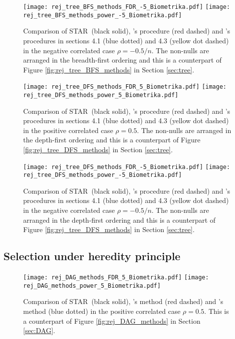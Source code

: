 \documentclass{biometrika}
\renewcommand{\star}{STAR}
\newcommand{\1}{\mathbf{1}}
\begin{document}
\begin{figure}[h]
  \centering
  \texttt{[image: rej\_tree\_BFS\_methods\_FDR\_-5\_Biometrika.pdf]}
  \texttt{[image: rej\_tree\_BFS\_methods\_power\_-5\_Biometrika.pdf]}
  \caption{Comparison of \star ~(black solid), \cite{yekutieli08}'s procedure (red dashed) and \cite{lynch16}'s procedures in  sections 4.1 (blue dotted) and 4.3 (yellow dot dashed) in the negative correlated case $\rho = -0.5/n$. The non-nulls are arranged in the breadth-first ordering and this is a counterpart of Figure \ref{fig:rej_tree_BFS_methods} in Section \ref{sec:tree}.}\label{fig:rej_tree_BFS_methods_-5}
\end{figure}

\begin{figure}[h]
  \centering
  \texttt{[image: rej\_tree\_DFS\_methods\_FDR\_5\_Biometrika.pdf]}
  \texttt{[image: rej\_tree\_DFS\_methods\_power\_5\_Biometrika.pdf]}
  \caption{Comparison of \star ~(black solid), \cite{yekutieli08}'s procedure (red dashed) and \cite{lynch16}'s procedures in  sections 4.1 (blue dotted) and 4.3 (yellow dot dashed) in the positive correlated case $\rho = 0.5$. The non-nulls are arranged in the depth-first ordering and this is a counterpart of Figure \ref{fig:rej_tree_DFS_methods} in Section \ref{sec:tree}.}\label{fig:rej_tree_DFS_methods_5}
\end{figure}

\begin{figure}[h]
  \centering
  \texttt{[image: rej\_tree\_DFS\_methods\_FDR\_-5\_Biometrika.pdf]}
  \texttt{[image: rej\_tree\_DFS\_methods\_power\_-5\_Biometrika.pdf]}
  \caption{Comparison of \star ~(black solid), \cite{yekutieli08}'s procedure (red dashed) and \cite{lynch16}'s procedures in  sections 4.1 (blue dotted) and 4.3 (yellow dot dashed) in the negative correlated case $\rho = -0.5/n$. The non-nulls are arranged in the depth-first ordering and this is a counterpart of Figure \ref{fig:rej_tree_DFS_methods} in Section \ref{sec:tree}.}\label{fig:rej_tree_DFS_methods_-5}
\end{figure}

\clearpage
\newpage
\subsection{Selection under heredity principle}

\begin{figure}[h]
  \centering
  \texttt{[image: rej\_DAG\_methods\_FDR\_5\_Biometrika.pdf]}
  \texttt{[image: rej\_DAG\_methods\_power\_5\_Biometrika.pdf]}
  \caption{Comparison of \star ~(black solid), \cite{lynch16}'s method (red dashed) and \cite{ramdas2017dagger}'s method (blue dotted) in the positive correlated case $\rho = 0.5$. This is a counterpart of Figure \ref{fig:rej_DAG_methods} in Section \ref{sec:DAG}.}\label{fig:rej_DAG_methods_5}
\end{figure}
\end{document}
